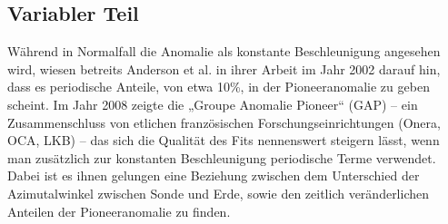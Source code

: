 
\subsection{Variabler Teil}
Während in Normalfall die Anomalie als konstante Beschleunigung angesehen wird, wiesen betreits Anderson et al. in
ihrer Arbeit im Jahr 2002 darauf hin, dass es periodische Anteile, von etwa 10\%, in der Pioneeranomalie zu
geben scheint.
Im Jahr 2008 zeigte die „Groupe Anomalie Pioneer“ (GAP) – ein Zusammenschluss von etlichen französischen Forschungseinrichtungen (Onera, OCA, LKB) –
das sich die Qualität des Fits nennenswert steigern lässt, wenn man zusätzlich zur konstanten Beschleunigung
periodische Terme verwendet.
Dabei ist es ihnen gelungen eine Beziehung zwischen dem Unterschied der Azimutalwinkel zwischen Sonde und Erde, sowie
den zeitlich veränderlichen Anteilen der Pioneeranomalie zu finden. %

